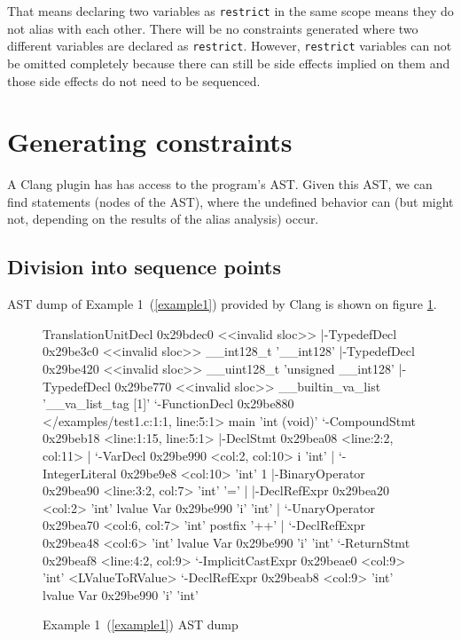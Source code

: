 That means declaring two variables as \verb|restrict| in the same scope means they do not alias with each other.
There will be no constraints generated where two different variables are declared as \verb|restrict|.
However, \verb|restrict| variables can not be omitted completely because there can still be side effects
implied on them and those side effects do not need to be sequenced.

\section{Generating constraints}
A Clang plugin has has access to the program's AST. Given this AST, we can find statements (nodes of the AST), where the undefined behavior can (but might not, depending on the results of the alias analysis) occur.
\subsection{Division into sequence points}
AST dump of Example 1~(\ref{example1}) provided by Clang is shown on figure \ref{ASTdump}.
\begin{figure}
\caption{Example 1~(\ref{example1}) AST dump}
\label{ASTdump}
\begin{code}
TranslationUnitDecl 0x29bdec0 <<invalid sloc>>
|-TypedefDecl 0x29be3c0 <<invalid sloc>> __int128_t '__int128'
|-TypedefDecl 0x29be420 <<invalid sloc>> __uint128_t 'unsigned __int128'
|-TypedefDecl 0x29be770 <<invalid sloc>> __builtin_va_list '__va_list_tag [1]'
`-FunctionDecl 0x29be880 </examples/test1.c:1:1, line:5:1> main 'int (void)'
  `-CompoundStmt 0x29beb18 <line:1:15, line:5:1>
    |-DeclStmt 0x29bea08 <line:2:2, col:11>
    | `-VarDecl 0x29be990 <col:2, col:10> i 'int'
    |   `-IntegerLiteral 0x29be9e8 <col:10> 'int' 1
    |-BinaryOperator 0x29bea90 <line:3:2, col:7> 'int' '='
    | |-DeclRefExpr 0x29bea20 <col:2> 'int' lvalue Var 0x29be990 'i' 'int'
    | `-UnaryOperator 0x29bea70 <col:6, col:7> 'int' postfix '++'
    |   `-DeclRefExpr 0x29bea48 <col:6> 'int' lvalue Var 0x29be990 'i' 'int'
    `-ReturnStmt 0x29beaf8 <line:4:2, col:9>
      `-ImplicitCastExpr 0x29beae0 <col:9> 'int' <LValueToRValue>
        `-DeclRefExpr 0x29beab8 <col:9> 'int' lvalue Var 0x29be990 'i' 'int'
\end{code}
\end{figure}

